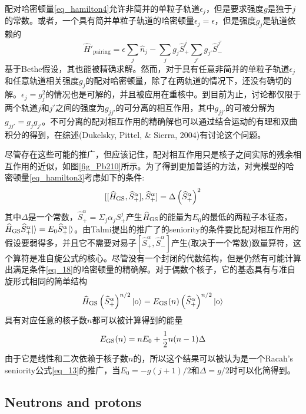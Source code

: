 配对哈密顿量\ref{eq_hamilton4}允许非简并的单粒子轨道$\epsilon_j$，但是要求强度$g$是独于$j$的常数。或者，一个具有简并单粒子轨道的哈密顿量$\epsilon_j=\epsilon$，但是强度$g_j$是轨道依赖的
\begin{equation}
\widehat{H}'_\textrm{pairing}=\epsilon\sum_j\widehat{n}_j-\sum_jg_j\widehat{S}^j_+\sum_{j'}g_{j'}\widehat{S}^{j'}_-
\end{equation}
基于Bethe假设，其也能被精确求解。然而，对于具有任意非简并的单粒子轨道$\epsilon_j$和任意轨道相关强度$g_j$的配对哈密顿量，除了在两轨道的情况下，还没有确切的解。$\epsilon_j=g_j^2$的情况也是可解的，并且被应用在重核中。到目前为止，讨论都仅限于两个轨道$j$和$j'$之间的强度为$g_{jj'}$的可分离的相互作用，其中$g_{jj'}$的可被分解为$g_{jj'}=g_jg_{j'}$。不可分离的配对相互作用的精确解也可以通过结合运动的有理和双曲积分的得到，在综述(Dukelsky, Pittel, \& Sierra, 2004)有讨论这个问题。

尽管存在这些可能的推广，但应该记住，配对相互作用只是核子之间实际的残余相互作用的近似，如图\ref{fig_Pb210}所示。为了得到更加普适的方法，对壳模型的哈密顿量\ref{eq_hamilton3}考虑如下的条件:
\begin{equation}\label{eq_18}
[[\widehat{H}_{\rm GS},\widehat{S}_+^\alpha],\widehat{S}_+^\alpha]=\Delta\left(\widehat{S}^\alpha_+\right)^2
\end{equation}
其中$\Delta$是一个常数，$\widehat{S}_+^\alpha=\Sigma_j\alpha_j S_+^j$产生$\widehat{H}_{\rm GS}$的能量为$E_0$的最低的两粒子本征态，$\widehat{H}_{\rm GS}\widehat{S}_+^\alpha|{\rm}\rangle=E_0\widehat{S}_+^\alpha|{\rm}\rangle$。由Talmi提出的推广了的seniority的条件要比配对相互作用的假设要弱得多，并且它不需要对易子$[\widehat{S}_+^\alpha,\widehat{S}_-^\alpha]$产生(取决于一个常数)数量算符，这个算符是准自旋公式的核心。尽管没有一个封闭的代数结构，但是仍然有可能计算出满足条件\ref{eq_18}的哈密顿量的精确解。对于偶数个核子，它的基态具有与准自旋形式相同的简单结构
\begin{equation}
\widehat{H}_{\rm GS}\left(\widehat{S}_+^\alpha\right)^{n/2}|{\rm o}\rangle=E_{\rm GS}(n)\left(\widehat{S}_+^\alpha\right)^{n/2}|{\rm o}\rangle
\end{equation}
具有对应任意的核子数$n$都可以被计算得到的能量
\begin{equation}
E_{\rm GS}(n)=nE_0+\frac{1}{2}n(n-1)\Delta
\end{equation}
由于它是线性和二次依赖于核子数$n$的，所以这个结果可以被认为是一个Racah’s seniority公式\ref{eq_13}的推广，当$E_0=-g(j+1)/2$和$\Delta=g/2$时可以化简得到。

\subsection{Neutrons and protons}